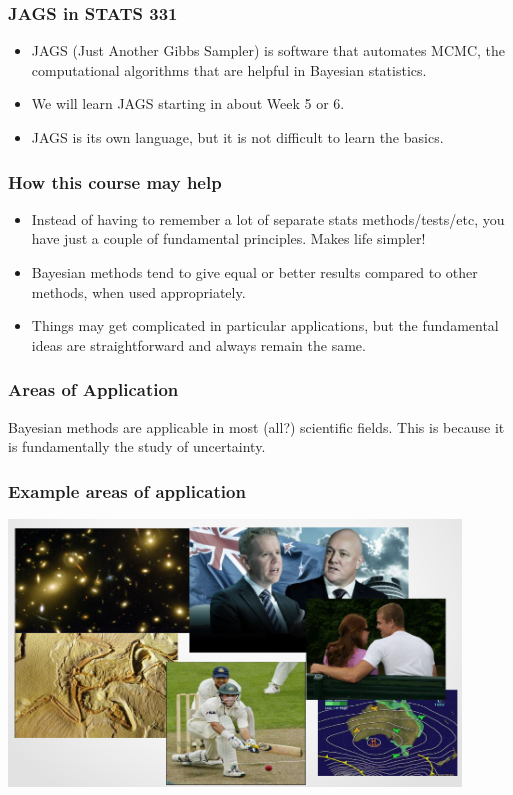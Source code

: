\documentclass{beamer}
\begin{document}
\begin{frame}
\frametitle{JAGS in STATS 331}
\begin{itemize}
\item JAGS (Just Another Gibbs Sampler) is software that automates MCMC, the
computational algorithms that are helpful in Bayesian statistics.\pause \\[0.5em]
\item We will learn JAGS starting in about Week 5 or 6.\pause \\[0.5em]
\item JAGS is its own language, but it is not difficult to learn the basics.
\end{itemize}


\end{frame}


\begin{frame}
\frametitle{How this course may help}
\begin{itemize}
\item Instead of having to remember a lot of separate stats methods/tests/etc, you have just a couple of fundamental principles. Makes life simpler!\pause \\[0.5em]

\item Bayesian methods tend to give equal or better results compared to
other methods, when used appropriately.\pause \\[0.5em]

\item Things may get complicated in particular applications, but the fundamental ideas are straightforward and always remain the same.
\end{itemize}
\end{frame}

\begin{frame}
\frametitle{Areas of Application}

Bayesian methods are applicable in most (all?) scientific fields.
This is because it is fundamentally the study of uncertainty.

\end{frame}

\begin{frame}
\frametitle{Example areas of application}
\includegraphics[width=0.9\textwidth]{images/montage.png}

\end{frame}
\end{document}

